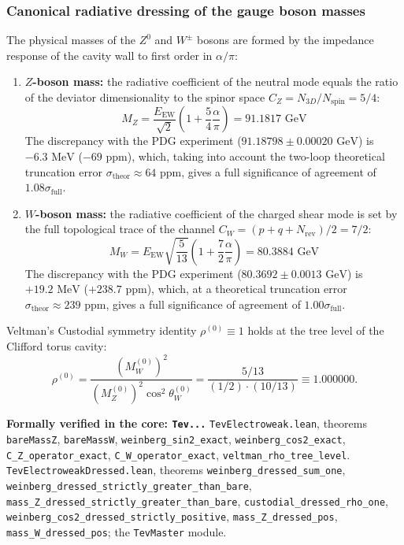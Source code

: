 \documentclass[11pt,a4paper]{article}
\theoremstyle{definition}
\theoremstyle{remark}
\begin{document}
\subsubsection{Canonical radiative dressing of the gauge boson masses}

The physical masses of the $Z^0$ and $W^\pm$ bosons are formed by the impedance response of the cavity wall to first order in $\alpha/\pi$:
\begin{enumerate}
    \item \textbf{$Z$-boson mass:} the radiative coefficient of the neutral mode equals the ratio of the deviator dimensionality to the spinor space $C_Z = N_{3D} / N_{\mathrm{spin}} = 5/4$:
    \begin{equation}
    M_Z = \frac{E_{\mathrm{EW}}}{\sqrt{2}} \left(1 + \frac{5}{4} \frac{\alpha}{\pi}\right) = 91.1817\text{ GeV}
    \end{equation}
    The discrepancy with the PDG experiment ($91.18798 \pm 0.00020\text{ GeV}$) is $-6.3\text{ MeV}$ ($-69\text{ ppm}$), which, taking into account the two-loop theoretical truncation error $\sigma_{\mathrm{theor}} \approx 64\text{ ppm}$, gives a full significance of agreement of $1.08\sigma_{\mathrm{full}}$.

    \item \textbf{$W$-boson mass:} the radiative coefficient of the charged shear mode is set by the full topological trace of the channel $C_W = (p + q + N_{\mathrm{rev}})/2 = 7/2$:
    \begin{equation}
    M_W = E_{\mathrm{EW}} \sqrt{\frac{5}{13}} \left(1 + \frac{7}{2} \frac{\alpha}{\pi}\right) = 80.3884\text{ GeV}
    \end{equation}
    The discrepancy with the PDG experiment ($80.3692 \pm 0.0013\text{ GeV}$) is $+19.2\text{ MeV}$ ($+238.7\text{ ppm}$), which, at a theoretical truncation error $\sigma_{\mathrm{theor}} \approx 239\text{ ppm}$, gives a full significance of agreement of $1.00\sigma_{\mathrm{full}}$.
\end{enumerate}

Veltman's Custodial symmetry identity $\rho^{(0)} \equiv 1$ holds at the tree level of the Clifford torus cavity:
\begin{equation}
\rho^{(0)} = \frac{(M_W^{(0)})^2}{(M_Z^{(0)})^2 \cos^2\theta_W^{(0)}} = \frac{5/13}{(1/2) \cdot (10/13)} \equiv \mathbf{1.000000}.
\end{equation}

\noindent\small\textbf{Formally verified in the core: \texttt{Tev...}} \texttt{TevElectroweak.lean}, theorems \texttt{bareMassZ}, \texttt{bareMassW}, \texttt{weinberg\_sin2\_exact}, \texttt{weinberg\_cos2\_exact}, \texttt{C\_Z\_operator\_exact}, \texttt{C\_W\_operator\_exact}, \texttt{veltman\_rho\_tree\_level}.\\ \texttt{TevElectroweakDressed.lean}, theorems \texttt{weinberg\_dressed\_sum\_one}, \texttt{weinberg\_dressed\_strictly\_greater\_than\_bare}, \texttt{mass\_Z\_dressed\_strictly\_greater\_than\_bare}, \texttt{custodial\_dressed\_rho\_one},\\ \texttt{weinberg\_cos2\_dressed\_strictly\_positive}, \texttt{mass\_Z\_dressed\_pos}, \texttt{mass\_W\_dressed\_pos}; the \texttt{TevMaster} module.
\end{document}
